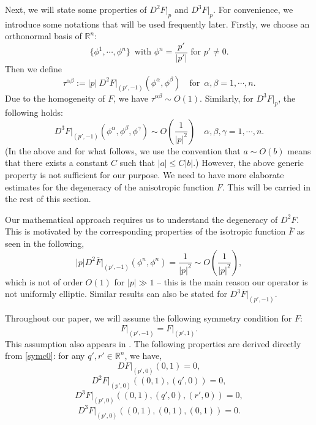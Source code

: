 \documentclass[12pt]{article}
\numberwithin{equation}{section}
\theoremstyle{plain}
\theoremstyle{definition}
\theoremstyle{remark}
\begin{document}
Next, we will state some properties of $D^2 F\Big|_p$ and $D^3 F\Big|_p$. For convenience,  we introduce some notations that will be used frequently later. Firstly, 
we choose an orthonormal basis of $\mathbb{R}^n$: 
\begin{equation}\label{ONB}
\{\phi^1, \cdots, \phi^n\}\,\,\,\text{with $\phi^n = \frac{p'}{|p'|}$ for $p'\neq0$.}
\end{equation}
Then we define
\begin{equation*}
    \tau^{\alpha \beta } := |p| \  D^2 F\Big|_{(p',-1)}(\phi^{\alpha}, \phi^{\beta}) \quad \text{for}\,\,\,\alpha,\beta = 1,\cdots,n.
\end{equation*}
Due to the homogeneity of $F$, we have $\tau^{\alpha \beta } \sim O(1)$. 
Similarly, for $D^3 F \Big|_p $, the following holds:
\begin{equation}\label{D3F.bd}
    D^3 F\Big|_{(p',-1)}(\phi^{\alpha}, \phi^{\beta}, \phi^{\gamma}) \sim O \left( \frac{1}{|p|^2}  \right)  \quad \alpha,\beta,\gamma = 1,\cdots,n.
\end{equation}
(In the above and for what follows, we use the convention that $a\sim O(b)$ means that there
exists a constant $C$ such that $|a| \leq C|b|$.)
However, the above generic property is not sufficient for our purpose. 
We need to have more elaborate estimates for the degeneracy of the anisotropic function $F$. This will be carried in the rest of this section.

Our mathematical approach requires us to understand the degeneracy of $D^2 F$. This is motivated by the
corresponding properties of the isotropic function $\overline{F}$ as seen in the following,
\begin{equation}
    |p|D^2 \overline{F} \Big|_{(p',-1)} (\phi^n,\phi^n) = \frac{1}{|p|^2} \sim O \left( \frac{1}{|p|^2}  \right) ,
\end{equation}
which is not of order $O(1)$ for $|p|\gg 1$ -- this is the main reason our operator is not uniformly elliptic. Similar results can also be stated for $D^3 \overline{F} \Big|_{(p',-1)}$.

Throughout our paper, we will assume the following symmetry condition for $F$:
\begin{equation}  \label{symc0}
    F\Big|_{(p',-1)} = F\Big|_{(p',1)}.
\end{equation}
This assumption also appears in \cite{Cl}.
The following properties are derived directly from \eqref{symc0}:
for any $q', r' \in \mathbb{R}^n $, we have,
\begin{equation} \label{symc1}
    DF\Big|_{(p',0)} (0,1) = 0,
\end{equation}
\begin{equation} \label{symc2}
    D^2 F\Big|_{(p',0)} ((0,1), (q',0)) = 0 ,
\end{equation}
\begin{equation} \label{symc3}
    D^3 F\Big|_{(p',0)} ((0,1), (q',0), (r',0)) =0,
\end{equation}
\begin{equation} \label{symc4}
    D^3 F\Big|_{(p',0)} ((0,1), (0,1), (0,1)) =0.
\end{equation}
\end{document}
